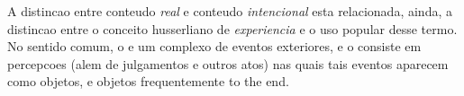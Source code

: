 A distincao entre conteudo \emph{real} e conteudo \emph{intencional} esta
relacionada, ainda, a distincao entre o conceito husserliano de
\emph{experiencia} e o uso popular desse termo. No sentido comum,
o  e um complexo de eventos exteriores,
e o  consiste em percepcoes (alem de julgamentos e outros
atos) nas quais tais eventos aparecem como objetos, e objetos frequentemente
to the end.
